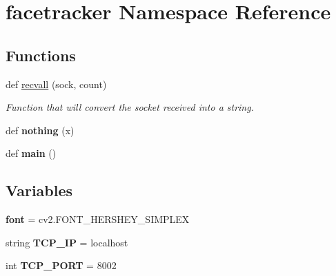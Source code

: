 \hypertarget{namespacefacetracker}{}\section{facetracker Namespace Reference}
\label{namespacefacetracker}
\subsection*{Functions}
\begin{DoxyCompactItemize}
\item 
def \hyperlink{namespacefacetracker_aeaf86b8cbf5f4faf7756b29092ddbfe2}{recvall} (sock, count)
\begin{DoxyCompactList}\small\item\em Function that will convert the socket received into a string. \end{DoxyCompactList}\item 
def {\bfseries nothing} (x)\hypertarget{namespacefacetracker_af994a8c3bd35f9d2f2cb16b0c0f29cbb}{}\label{namespacefacetracker_af994a8c3bd35f9d2f2cb16b0c0f29cbb}

\item 
def {\bfseries main} ()\hypertarget{namespacefacetracker_acffbe43cef12f89f6cf7902772ca9ee1}{}\label{namespacefacetracker_acffbe43cef12f89f6cf7902772ca9ee1}

\end{DoxyCompactItemize}
\subsection*{Variables}
\begin{DoxyCompactItemize}
\item 
{\bfseries font} = cv2.\+F\+O\+N\+T\+\_\+\+H\+E\+R\+S\+H\+E\+Y\+\_\+\+S\+I\+M\+P\+L\+EX\hypertarget{namespacefacetracker_af8f8c0f83a1bcab62b58ffe151d54257}{}\label{namespacefacetracker_af8f8c0f83a1bcab62b58ffe151d54257}

\item 
string {\bfseries T\+C\+P\+\_\+\+IP} = \textquotesingle{}localhost\textquotesingle{}\hypertarget{namespacefacetracker_a0d3f577882e0f8deade5722e75594b58}{}\label{namespacefacetracker_a0d3f577882e0f8deade5722e75594b58}

\item 
int {\bfseries T\+C\+P\+\_\+\+P\+O\+RT} = 8002\hypertarget{namespacefacetracker_a7fd84c2f2afecb14acb6526007adb04a}{}\label{namespacefacetracker_a7fd84c2f2afecb14acb6526007adb04a}

\end{DoxyCompactItemize}


